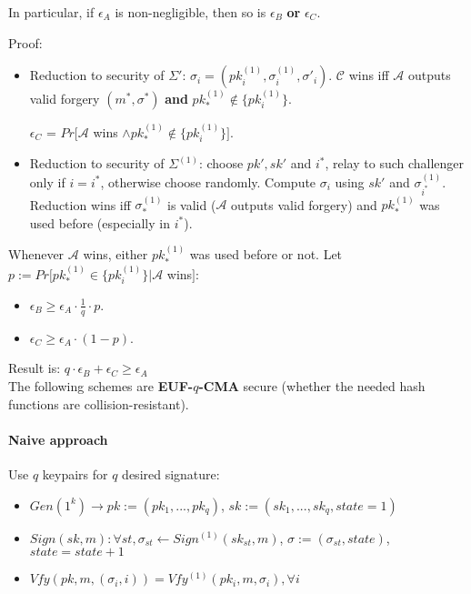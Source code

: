 \documentclass[oneside]{book}
\newcommand{\cA}[0]{\mathcal{A}}
\newcommand{\cC}[0]{\mathcal{C}}
\begin{document}
In particular, if $\epsilon_A$ is non-negligible, then so is $\epsilon_B$ \textbf{or} $\epsilon_C$.

Proof:
\begin{itemize}
    \item Reduction to security of $\Sigma'$: $\sigma_i = (pk_i^{(1)}, \sigma_i^{(1)}, \sigma'_i)$. $\cC$ wins iff  $\cA$ outputs valid forgery $(m^*, \sigma^*)$ \textbf{and} $pk_*^{(1)} \notin \{pk_i^{(1)}\}$.
    
    $\epsilon_C$ = $Pr[\cA$ wins $\land pk_*^{(1)} \notin \{pk_i^{(1)}\}]$.
    \item Reduction to security of $\Sigma^{(1)}$: choose $pk', sk'$ and $i^*$, relay to such challenger only if $i = i^*$, otherwise choose randomly. Compute $\sigma_i$ using $sk'$ and $\sigma_{i^*}^{(1)}$. Reduction wins iff $\sigma_*^{(1)}$ is valid ($\cA$ outputs valid forgery) and $pk_*^{(1)}$ was used before (especially in $i^*$).
    
    
\end{itemize}

Whenever $\cA$ wins, either $pk_*^{(1)}$ was used before or not. Let $p := Pr[pk_*^{(1)} \in \{pk_i^{(1)}\} | \cA$ wins$]$:
\begin{itemize}
    \item $\epsilon_B \ge \epsilon_A \cdot \frac{1}{q} \cdot p$.
    \item $\epsilon_C \ge \epsilon_A \cdot (1-p)$.
\end{itemize}

Result is: $q \cdot \epsilon_B + \epsilon_C \ge \epsilon_A$\\

The following schemes are \textbf{EUF-$q$-CMA} secure (whether the needed hash functions are collision-resistant).
\paragraph{Naive approach} Use $q$ keypairs for $q$ desired signature:
\begin{itemize}
    \item $Gen(1^k) \rightarrow pk := (pk_1, ..., pk_q)$, $sk := (sk_1, ..., sk_q, state=1)$
    \item $Sign(sk, m): \forall st, \sigma_{st} \leftarrow Sign^{(1)}(sk_{st}, m)$, $\sigma := (\sigma_{st}, state)$, $state = state + 1$
    \item $Vfy(pk, m, (\sigma_i, i)) = Vfy^{(1)}(pk_i, m, \sigma_i), \forall i$
\end{itemize}
\end{document}
